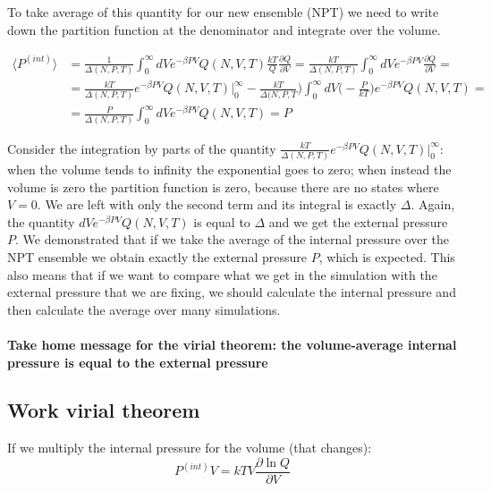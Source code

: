 To take average of this quantity for our new ensemble (NPT) we need to write down the partition function at the denominator and integrate over the volume.

	\begin{align*}
		\langle P^{(int)}\rangle &= \frac{1}{\Delta(N, P, T)}\int_0^{\infty}dVe^{-\beta PV}Q(N, V, T)\frac{kT}{Q}\frac{\partial Q}{\partial V} = \frac{kT}{\Delta(N, P, T)}\int_0^{\infty}dVe^{-\beta PV}\frac{\partial Q}{\partial V}=\\
														 &= \frac{kT}{\Delta(N, P, T)}e^{-\beta PV}Q(N, V, T)|_0^{\infty}-\frac{kT}{\Delta(N, P, T})\int_0^{\infty}dV\biggl(-\frac{P}{kT}\biggr)e^{-\beta PV}Q(N, V, T) = \\
														 &=\frac{P}{\Delta(N, P, T)}\int_0^{\infty}dVe^{-\beta PV}Q(N, V, T) = P
	\end{align*}

	Consider the integration by parts of the quantity $\frac{kT}{\Delta(N, P, T)}e^{-\beta PV}Q(N, V, T)|_0^{\infty}$: when the volume tends to infinity the exponential goes to zero; when instead the volume is zero the partition function is zero, because there are no states where $V=0$.
	We are left with only the second term and its integral is exactly $\Delta$.
	Again, the quantity $dVe^{-\beta PV}Q(N, V, T)$ is equal to $\Delta$ and we get the external pressure $P$.
	We demonstrated that if we take the average of the internal pressure over the NPT ensemble we obtain exactly the external pressure $P$, which is expected.
	 This also means that if we want to compare what we get in the simulation with the external pressure that we are fixing, we should calculate the internal pressure and then calculate the average over many simulations.

	 \paragraph{Take home message for the virial theorem: the volume-average internal pressure is equal to the external pressure}

	\subsection{Work virial theorem}
If we multiply the internal pressure for the volume (that changes):
	$$P^{(int)}V = kTV\frac{\partial \ln Q}{\partial V}$$


